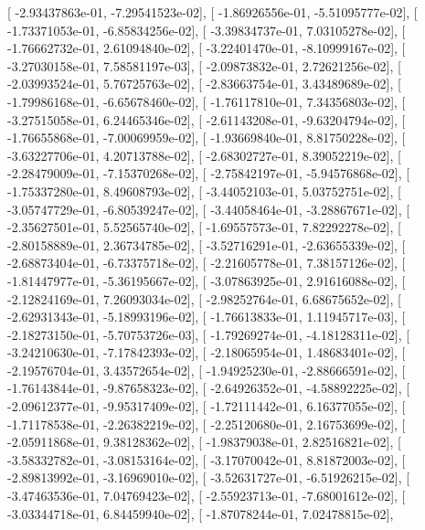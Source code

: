 \documentclass{article}
\begin{document}
       [ -2.93437863e-01,  -7.29541523e-02],
       [ -1.86926556e-01,  -5.51095777e-02],
       [ -1.73371053e-01,  -6.85834256e-02],
       [ -3.39834737e-01,   7.03105278e-02],
       [ -1.76662732e-01,   2.61094840e-02],
       [ -3.22401470e-01,  -8.10999167e-02],
       [ -3.27030158e-01,   7.58581197e-03],
       [ -2.09873832e-01,   2.72621256e-02],
       [ -2.03993524e-01,   5.76725763e-02],
       [ -2.83663754e-01,   3.43489689e-02],
       [ -1.79986168e-01,  -6.65678460e-02],
       [ -1.76117810e-01,   7.34356803e-02],
       [ -3.27515058e-01,   6.24465346e-02],
       [ -2.61143208e-01,  -9.63204794e-02],
       [ -1.76655868e-01,  -7.00069959e-02],
       [ -1.93669840e-01,   8.81750228e-02],
       [ -3.63227706e-01,   4.20713788e-02],
       [ -2.68302727e-01,   8.39052219e-02],
       [ -2.28479009e-01,  -7.15370268e-02],
       [ -2.75842197e-01,  -5.94576868e-02],
       [ -1.75337280e-01,   8.49608793e-02],
       [ -3.44052103e-01,   5.03752751e-02],
       [ -3.05747729e-01,  -6.80539247e-02],
       [ -3.44058464e-01,  -3.28867671e-02],
       [ -2.35627501e-01,   5.52565740e-02],
       [ -1.69557573e-01,   7.82292278e-02],
       [ -2.80158889e-01,   2.36734785e-02],
       [ -3.52716291e-01,  -2.63655339e-02],
       [ -2.68873404e-01,  -6.73375718e-02],
       [ -2.21605778e-01,   7.38157126e-02],
       [ -1.81447977e-01,  -5.36195667e-02],
       [ -3.07863925e-01,   2.91616088e-02],
       [ -2.12824169e-01,   7.26093034e-02],
       [ -2.98252764e-01,   6.68675652e-02],
       [ -2.62931343e-01,  -5.18993196e-02],
       [ -1.76613833e-01,   1.11945717e-03],
       [ -2.18273150e-01,  -5.70753726e-03],
       [ -1.79269274e-01,  -4.18128311e-02],
       [ -3.24210630e-01,  -7.17842393e-02],
       [ -2.18065954e-01,   1.48683401e-02],
       [ -2.19576704e-01,   3.43572654e-02],
       [ -1.94925230e-01,  -2.88666591e-02],
       [ -1.76143844e-01,  -9.87658323e-02],
       [ -2.64926352e-01,  -4.58892225e-02],
       [ -2.09612377e-01,  -9.95317409e-02],
       [ -1.72111442e-01,   6.16377055e-02],
       [ -1.71178538e-01,  -2.26382219e-02],
       [ -2.25120680e-01,   2.16753699e-02],
       [ -2.05911868e-01,   9.38128362e-02],
       [ -1.98379038e-01,   2.82516821e-02],
       [ -3.58332782e-01,  -3.08153164e-02],
       [ -3.17070042e-01,   8.81872003e-02],
       [ -2.89813992e-01,  -3.16969010e-02],
       [ -3.52631727e-01,  -6.51926215e-02],
       [ -3.47463536e-01,   7.04769423e-02],
       [ -2.55923713e-01,  -7.68001612e-02],
       [ -3.03344718e-01,   6.84459940e-02],
       [ -1.87078244e-01,   7.02478815e-02],
\end{document}
